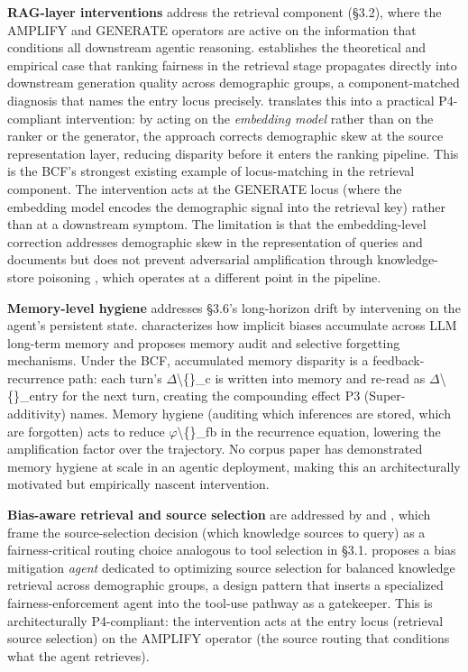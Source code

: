 \documentclass[10pt]{article}
\begin{document}
\textbf{RAG-layer interventions} address the retrieval component (\S{}3.2), where the AMPLIFY and GENERATE operators are active on the information that conditions all downstream agentic reasoning. \cite{kim2024fair} establishes the theoretical and empirical case that ranking fairness in the retrieval stage propagates directly into downstream generation quality across demographic groups, a component-matched diagnosis that names the entry locus precisely. \cite{kim2025mitigating} translates this into a practical P4-compliant intervention: by acting on the \emph{embedding model} rather than on the ranker or the generator, the approach corrects demographic skew at the source representation layer, reducing disparity before it enters the ranking pipeline. This is the BCF's strongest existing example of locus-matching in the retrieval component. The intervention acts at the GENERATE locus (where the embedding model encodes the demographic signal into the retrieval key) rather than at a downstream symptom. The limitation is that the embedding-level correction addresses demographic skew in the representation of queries and documents but does not prevent adversarial amplification through knowledge-store poisoning \cite{wang2025bias}, which operates at a different point in the pipeline.

\textbf{Memory-level hygiene} addresses \S{}3.6's long-horizon drift by intervening on the agent's persistent state. \cite{ma2026implicit} characterizes how implicit biases accumulate across LLM long-term memory and proposes memory audit and selective forgetting mechanisms. Under the BCF, accumulated memory disparity is a feedback-recurrence path: each turn's $\Delta$\textbackslash\{\}\_c is written into memory and re-read as $\Delta$\textbackslash\{\}\_entry for the next turn, creating the compounding effect P3 (Super-additivity) names. Memory hygiene (auditing which inferences are stored, which are forgotten) acts to reduce $\varphi$\textbackslash\{\}\_fb in the recurrence equation, lowering the amplification factor over the trajectory. No corpus paper has demonstrated memory hygiene at scale in an agentic deployment, making this an architecturally motivated but empirically nascent intervention.

\textbf{Bias-aware retrieval and source selection} are addressed by \cite{singh2025bias} and \cite{singh2025biasb}, which frame the source-selection decision (which knowledge sources to query) as a fairness-critical routing choice analogous to tool selection in \S{}3.1. \cite{singh2025biasb} proposes a bias mitigation \emph{agent} dedicated to optimizing source selection for balanced knowledge retrieval across demographic groups, a design pattern that inserts a specialized fairness-enforcement agent into the tool-use pathway as a gatekeeper. This is architecturally P4-compliant: the intervention acts at the entry locus (retrieval source selection) on the AMPLIFY operator (the source routing that conditions what the agent retrieves).
\end{document}
